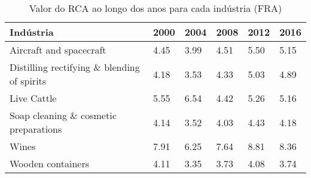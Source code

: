 \begin{table}
\centering
\caption{Valor do RCA ao longo dos anos para cada indústria (FRA)}
\begin{tabular}{p{6cm}p{1.5cm}p{1.5cm}p{1.5cm}p{1.5cm}p{1.5cm}}
\toprule
                                  Indústria & 2000 & 2004 & 2008 & 2012 & 2016 \\
\midrule
                    Aircraft and spacecraft & 4.45 & 3.99 & 4.51 & 5.50 & 5.15 \\
Distilling rectifying \& blending of spirits & 4.18 & 3.53 & 4.33 & 5.03 & 4.89 \\
                                Live Cattle & 5.55 & 6.54 & 4.42 & 5.26 & 5.16 \\
      Soap cleaning \& cosmetic preparations & 4.14 & 3.52 & 4.03 & 4.43 & 4.18 \\
                                      Wines & 7.91 & 6.25 & 7.64 & 8.81 & 8.36 \\
                          Wooden containers & 4.11 & 3.35 & 3.73 & 4.08 & 3.74 \\
\bottomrule
\end{tabular}
\end{table}
